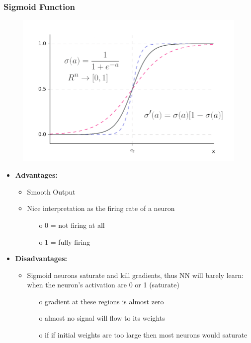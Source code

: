 \documentclass[12pt]{report}
\theoremstyle{plain}
\begin{document}
\begin{flushleft}
\subsubsection{Sigmoid Function}
\begin{figure}[!h]
	\centering
	\includegraphics[scale=1.2]{images/NN_sigmoid_act.pdf}
\end{figure}
\begin{itemize}
	\item \textbf{Advantages:}
	\begin{itemize}
		\item Smooth Output
		\item Nice interpretation as the firing rate of a neuron 
		\begin{itemize}
			\item[o] $0$ = not firing at all
			\item[o] $1$ = fully firing
		\end{itemize}
	\end{itemize}
	\item \textbf{Disadvantages:}
	\begin{itemize}
		\item Sigmoid neurons saturate and kill gradients, thus NN will barely learn: when the neuron's activation are 0 or 1 (saturate) 
		\begin{itemize}
			\item[o] gradient at these regions is almost zero
			\item[o] almost no signal will flow to its weights
			\item[o] if if initial weights are too large then most neurons would saturate 
		\end{itemize}
	\end{itemize}
\end{itemize}


\end{flushleft}
\end{document}
